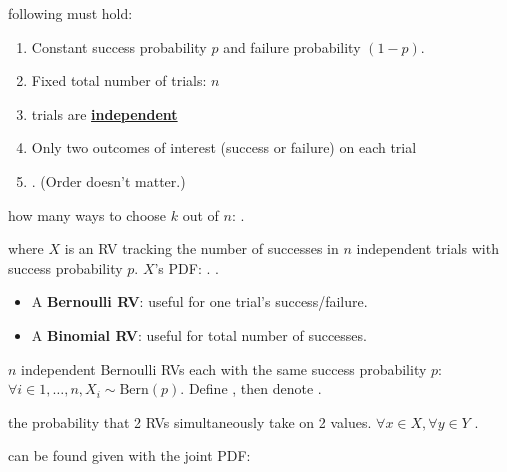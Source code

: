 \documentclass[10pt,landscape]{article}
\newcommand{\Blue}[1]{\noindent{\textbf{\textcolor{Blue}{#1 -}}}}
\newcommand{\Red}[1]{\noindent{\textbf{\textcolor{BrickRed}{#1 -}}}}
\newcommand{\Green}[1]{\noindent{\textbf{\textcolor{PineGreen}{#1 -}}}}
\newcommand{\Hint}[1]{\noindent{\textcolor{Orange}{#1}}}
\begin{document}
\begin{multicols}{4}
\Red{Binomial Problems} following must hold:
\begin{enumerate}
    \item Constant success probability $p$ and failure probability $(1-p)$.
    \item Fixed total number of trials: $n$
    \item trials are \underline{\textbf{independent}}
    \item Only two outcomes of interest (success or failure) on each trial
    \item \Hint{Want to find the probability of observing $k$ successes among the total number of $n$ trials}. (Order doesn't matter.)
\end{enumerate}

\Blue{Combination} how many ways to choose $k$ out of $n$: .

\Red{Binomial Distribution}  where $X$ is an RV tracking the number of successes in
$n$ independent trials with success probability $p$. $X$'s PDF:
.
\Hint{Attn: $X$ here is not for one single trial!}.
\begin{itemize}
    \item A \textbf{Bernoulli RV}: useful for one trial's success/failure.
    \item A \textbf{Binomial RV}: useful for total number of successes.
\end{itemize}
\Blue{Binomial as the Sum of Bernoullis} $n$ independent Bernoulli RVs each with the same success probability $p$:
$\forall i \in {1, \dots, n}, X_i \sim \text{Bern}(p)$.
Define , then denote .
\Hint{$\text{Binom}(1, p) = \text{Bern}(p)$}

\Red{Joint Distribution of 2 RVs} the probability that 2 RVs simultaneously take on 2 values.
$\forall x \in X, \forall y \in Y$ .

\Green{Marginal probability distribution} can be found given with the joint PDF:

\Red{Z-Score of a Random Variable $X$}

\Hint{$\mathbb{E}\left[Z(X)\right] = 0$ and $SD(Z(X)) = 1$}


\end{multicols}
\end{document}
